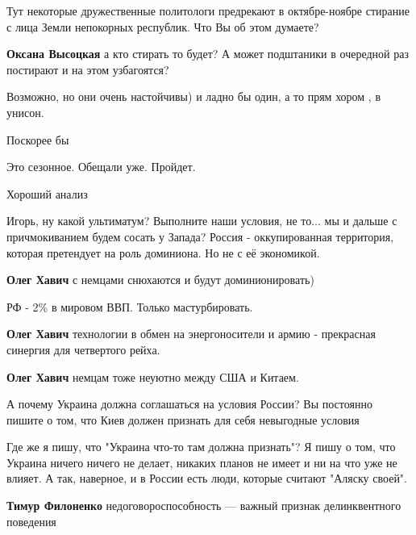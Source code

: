 \begin{itemize}

Тут некоторые дружественные политологи предрекают в октябре-ноябре стирание с
лица Земли непокорных республик. Что Вы об этом думаете?

\begin{itemize} %
\textbf{Оксана Высоцкая} а кто стирать то будет? А может подштаники в очередной раз постирают и на этом узбагоятся?

Возможно, но они очень настойчивы) и ладно бы один, а то прям хором , в унисон.

Поскорее бы

Это сезонное. Обещали уже. Пройдет.
\end{itemize} %

Хороший анализ


Игорь, ну какой ультиматум? Выполните наши условия, не то... мы и дальше с
причмокиванием будем сосать у Запада? Россия - оккупированная территория,
которая претендует на роль доминиона. Но не с её экономикой.

\begin{itemize} %
\textbf{Олег Хавич} с немцами снюхаются и будут доминионировать)

РФ - 2\% в мировом ВВП. Только мастурбировать.

\textbf{Олег Хавич} технологии в обмен на энергоносители и армию - прекрасная синергия для четвертого рейха.

\textbf{Олег Хавич} немцам тоже неуютно между США и Китаем.
\end{itemize} %


А почему Украина должна соглашаться на условия России? Вы постоянно пишите о
том, что Киев должен признать для себя невыгодные условия

\begin{itemize} %

Где же я пишу, что "Украина что-то там должна признать"? Я пишу о том, что
Украина ничего ничего не делает, никаких планов не имеет и ни на что уже не
влияет. А так, наверное, и в России есть люди, которые считают "Аляску своей".

\textbf{Тимур Филоненко} недоговороспособность — важный признак делинквентного поведения


\end{itemize}
\end{itemize}
